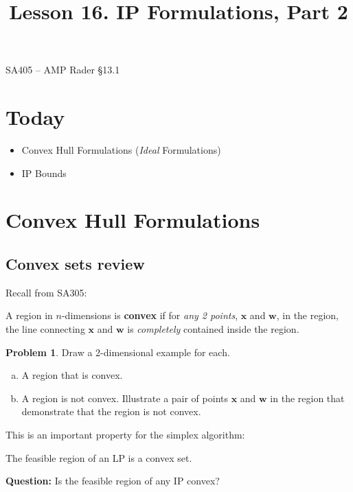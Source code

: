 \documentclass[11pt]{article}
\makeatletter
\renewcommand{\labelitemi}{$\bullet$}
\theoremstyle{definition}
\newtheorem{problem}{Problem}
\newcommand{\answerbox}[3]{%
  \fbox{%
    \begin{minipage}[#1]{#2}
      \hfill\vspace{#3}
    \end{minipage}
  }
}
\renewcommand{\maketitle}{
  \noindent SA405 -- AMP \hfill Rader \S 13.1  \\

  \begin{center}\Large{\textbf{\@title}}\end{center}
}
\makeatother
\begin{document}
  
\title{Lesson 16.  IP Formulations, Part 2}

\maketitle

\section{Today}
\renewcommand\labelitemi{--}
\begin{itemize}
\item  Convex Hull Formulations (\emph{Ideal} Formulations)
\item  IP Bounds
\end{itemize}

\section{Convex Hull Formulations} 

\subsection{Convex sets review}
Recall from SA305:
\begin{tcolorbox}
A region in $n$-dimensions is \textbf{convex} if for \emph{any 2 points}, $\textbf{x}$ and $\textbf{w}$, in the region, the line connecting $\textbf{x}$ and $\textbf{w}$ is \emph{completely} contained inside the region.
\end{tcolorbox}

\begin{problem} Draw a 2-dimensional example for each.
 \begin{enumerate}[(a)]
\item A region that is convex.
\item A region is not convex.  Illustrate a pair of points $\textbf{x}$ and $\textbf{w}$ in the region that demonstrate that the region is not convex.
\end{enumerate}
\answerbox{c}{.5\textwidth}{2in} \answerbox{c}{.5\textwidth}{2in}
\end{problem}

This is an important property for the simplex algorithm:
\begin{tcolorbox}
The feasible region of an LP is a convex set. 
\end{tcolorbox}

\textbf{Question:}  Is the feasible region of any IP convex?
\end{document}

